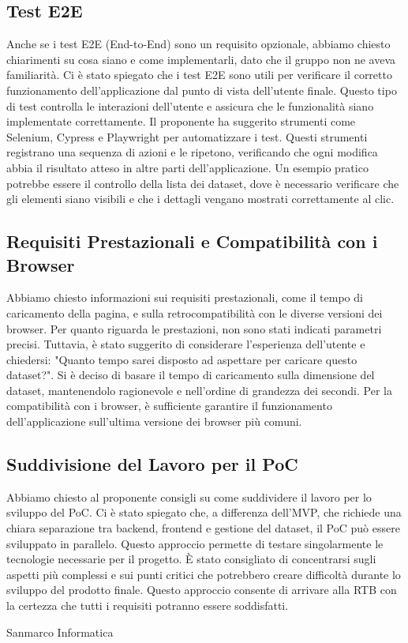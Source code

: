 \subsection{Test E2E}
Anche se i test E2E (End-to-End) sono un requisito opzionale, abbiamo chiesto chiarimenti su cosa siano e come implementarli, dato che il gruppo non ne aveva familiarità.
Ci è stato spiegato che i test E2E sono utili per verificare il corretto funzionamento dell’applicazione dal punto di vista dell’utente finale. 
Questo tipo di test controlla le interazioni dell’utente e assicura che le funzionalità siano implementate correttamente.
Il proponente ha suggerito strumenti come Selenium, Cypress e Playwright per automatizzare i test. 
Questi strumenti registrano una sequenza di azioni e le ripetono, verificando che ogni modifica abbia il risultato atteso in altre parti dell’applicazione. 
Un esempio pratico potrebbe essere il controllo della lista dei dataset, dove è necessario verificare che gli elementi siano visibili e che i dettagli vengano mostrati correttamente al clic.

\subsection{Requisiti Prestazionali e Compatibilità con i Browser}
Abbiamo chiesto informazioni sui requisiti prestazionali, come il tempo di caricamento della pagina, e sulla retrocompatibilità con le diverse versioni dei browser.
Per quanto riguarda le prestazioni, non sono stati indicati parametri precisi. 
Tuttavia, è stato suggerito di considerare l’esperienza dell’utente e chiedersi: "Quanto tempo sarei disposto ad aspettare per caricare questo dataset?". 
Si è deciso di basare il tempo di caricamento sulla dimensione del dataset, mantenendolo ragionevole e nell’ordine di grandezza dei secondi.
Per la compatibilità con i browser, è sufficiente garantire il funzionamento dell’applicazione sull’ultima versione dei browser più comuni.

\subsection{Suddivisione del Lavoro per il PoC}
Abbiamo chiesto al proponente consigli su come suddividere il lavoro per lo sviluppo del PoC.
Ci è stato spiegato che, a differenza dell’MVP, che richiede una chiara separazione tra backend, frontend e gestione del dataset, il PoC può essere sviluppato in parallelo. 
Questo approccio permette di testare singolarmente le tecnologie necessarie per il progetto.
È stato consigliato di concentrarsi sugli aspetti più complessi e sui punti critici che potrebbero creare difficoltà durante lo sviluppo del prodotto finale. 
Questo approccio consente di arrivare alla RTB con la certezza che tutti i requisiti potranno essere soddisfatti.

\hfill\signature{Approvazione esterna}{Sanmarco Informatica}

